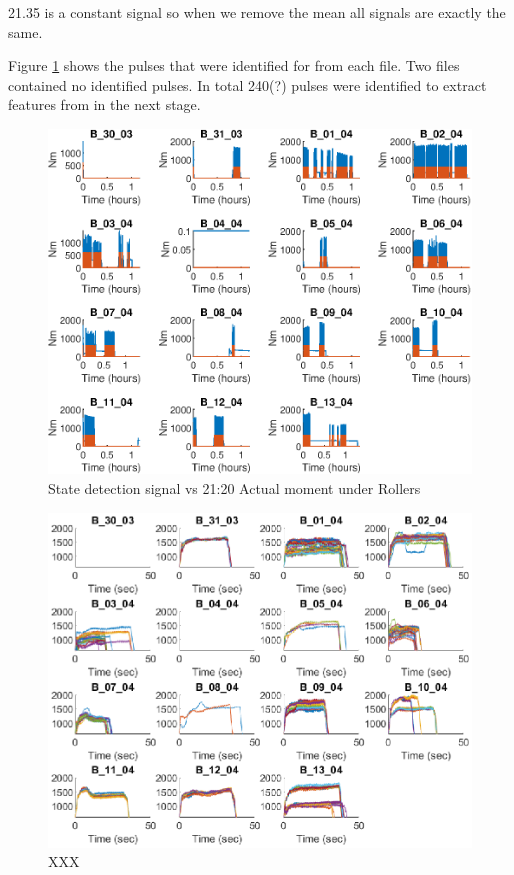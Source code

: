\documentclass{article}
\begin{document}
21.35 is a constant signal so when we remove the mean all signals are exactly the same.

Figure \ref{fig:StateDetection} shows the pulses that were identified for from each file. Two files contained no identified pulses. In total 240(?) pulses were identified to extract features from in the next stage.

\begin{figure}[!ht]
    \centering
    \includegraphics[width=\textwidth, height=\textheight, keepaspectratio]{figures/StateDetectionFig.eps}
    \caption{State detection signal vs 21:20 Actual moment under Rollers}
    \label{fig:StateDetection}
\end{figure}

\begin{figure}[!ht]
    \centering
    \includegraphics[width=\textwidth, height=\textheight, keepaspectratio]{figures/IdentifiedPulsesFig.eps}
    \caption{XXX}
    \label{fig:IdentifiedPulses}
\end{figure}
\end{document}
